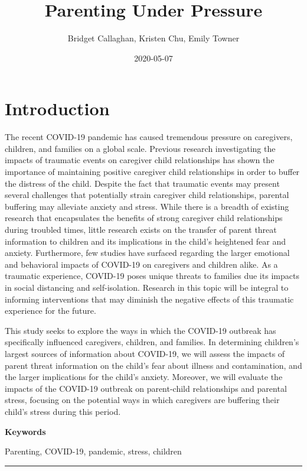 \documentclass[]{book}
\title{Parenting Under Pressure}
\author{Bridget Callaghan, Kristen Chu, Emily Towner}
\date{2020-05-07}
\begin{document}
\maketitle

{
\setcounter{tocdepth}{1}
\tableofcontents
}
\hypertarget{introduction}{%
\chapter{Introduction}\label{introduction}}

The recent COVID-19 pandemic has caused tremendous pressure on caregivers, children, and families on a global scale. Previous research investigating the impacts of traumatic events on caregiver child relationships has shown the importance of maintaining positive caregiver child relationships in order to buffer the distress of the child. Despite the fact that traumatic events may present several challenges that potentially strain caregiver child relationships, parental buffering may alleviate anxiety and stress. While there is a breadth of existing research that encapsulates the benefits of strong caregiver child relationships during troubled times, little research exists on the transfer of parent threat information to children and its implications in the child's heightened fear and anxiety. Furthermore, few studies have surfaced regarding the larger emotional and behavioral impacts of COVID-19 on caregivers and children alike. As a traumatic experience, COVID-19 poses unique threats to families due its impacts in social distancing and self-isolation. Research in this topic will be integral to informing interventions that may diminish the negative effects of this traumatic experience for the future.

This study seeks to explore the ways in which the COVID-19 outbreak has specifically influenced caregivers, children, and families. In determining children's largest sources of information about COVID-19, we will assess the impacts of parent threat information on the child's fear about illness and contamination, and the larger implications for the child's anxiety. Moreover, we will evaluate the impacts of the COVID-19 outbreak on parent-child relationships and parental stress, focusing on the potential ways in which caregivers are buffering their child's stress during this period.

\textbf{Keywords}

Parenting, COVID-19, pandemic, stress, children

\begin{center}\rule{0.5\linewidth}{0.5pt}\end{center}
\end{document}
